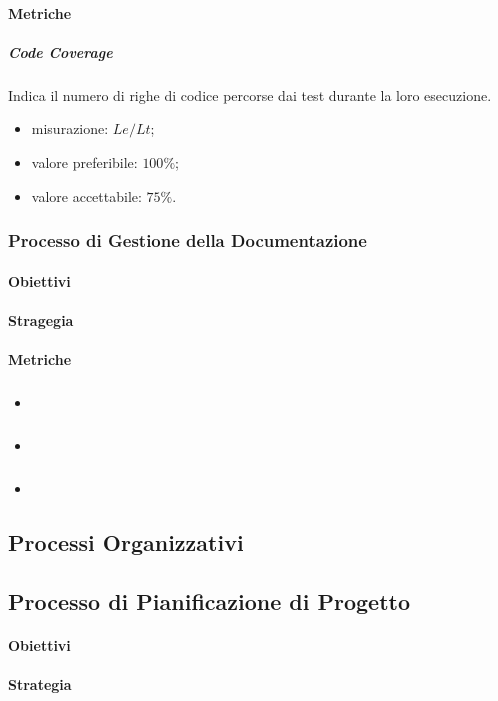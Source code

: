 		\paragraph{Metriche}
			\subparagraph{Code Coverage}
				Indica il numero di righe di codice percorse dai test durante la loro esecuzione. 
				\begin{itemize}
					\item misurazione: $Le/Lt$;
					\item valore preferibile: $100\%$;
					\item valore accettabile: $75\%$.
				\end{itemize}
	\subsubsection{Processo di Gestione della Documentazione}
		\paragraph{Obiettivi}
		\paragraph{Stragegia}
		\paragraph{Metriche}
			\subparagraph{} 
			\begin{itemize}
				\item \textbf{}
				\item \textbf{}
				\item \textbf{}
			\end{itemize}
		
\subsection{Processi Organizzativi}
	\subsection{Processo di Pianificazione di Progetto}	
		\paragraph{Obiettivi}
		\paragraph{Strategia}
